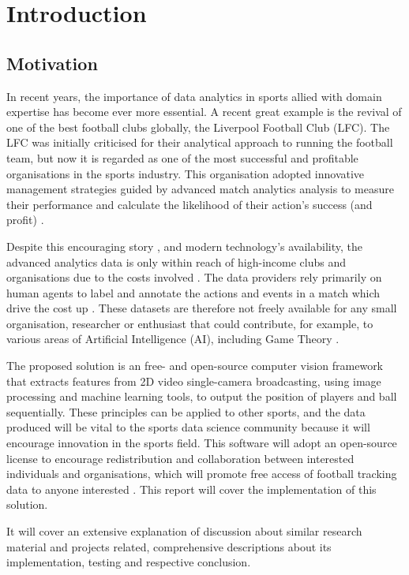 \documentclass[
    11pt,
    oneside
]{report}
\begin{document}
\chapter{Introduction}

\section{Motivation}


In recent years, the importance of data analytics in sports allied with domain expertise has become ever more essential. A recent great example is the revival of one of the best football clubs globally, the Liverpool Football Club (LFC). The LFC was initially criticised for their analytical approach to running the football team, but now it is regarded as one of the most successful and profitable organisations in the sports industry. This organisation adopted innovative management strategies guided by advanced match analytics analysis to measure their performance and calculate the likelihood of their action's success (and profit) \cite{liverpool}.


Despite this encouraging story \cite{liverpool}, and modern technology's availability, the advanced analytics data is only within reach of high-income clubs and organisations due to the costs involved \cite{opta}. The data providers rely primarily on human agents to label and annotate the actions and events in a match which drive the cost up \cite{opta}. These datasets are therefore not freely available for any small organisation, researcher or enthusiast that could contribute, for example, to various areas of Artificial Intelligence (AI), including Game Theory \cite{deepmind}.


The proposed solution is an free- and open-source computer vision framework that extracts features from 2D video single-camera broadcasting, using image processing and machine learning tools, to output the position of players and ball sequentially. These principles can be applied to other sports, and the data produced will be vital to the sports data science community because it will encourage innovation in the sports field. This software will adopt an open-source license to encourage redistribution and collaboration between interested individuals and organisations, which will promote free access of football tracking data to anyone interested \cite{osd}.  This report will cover the implementation of this solution.


It will cover an extensive explanation of  discussion about similar research material and projects related, comprehensive descriptions about its implementation, testing and respective conclusion.
\end{document}
